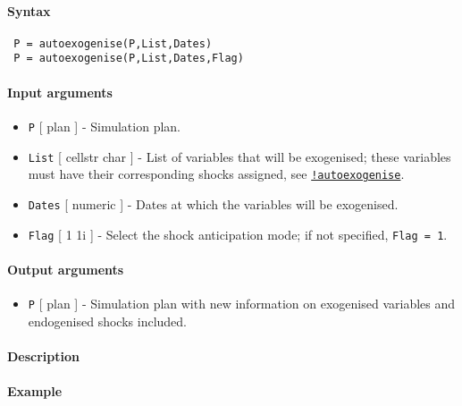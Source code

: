


	\paragraph{Syntax}
 
 \begin{verbatim}
 P = autoexogenise(P,List,Dates)
 P = autoexogenise(P,List,Dates,Flag)
 \end{verbatim}
 
 \paragraph{Input arguments}
 
 \begin{itemize}
 \item
   \texttt{P} {[} plan {]} - Simulation plan.
 \item
   \texttt{List} {[} cellstr \textbar{} char {]} - List of variables that
   will be exogenised; these variables must have their corresponding
   shocks assigned, see
   \href{modellang/autoexogenise}{\texttt{!autoexogenise}}.
 \item
   \texttt{Dates} {[} numeric {]} - Dates at which the variables will be
   exogenised.
 \item
   \texttt{Flag} {[} 1 \textbar{} 1i {]} - Select the shock anticipation
   mode; if not specified, \texttt{Flag = 1}.
 \end{itemize}
 
 \paragraph{Output arguments}
 
 \begin{itemize}
 \item
   \texttt{P} {[} plan {]} - Simulation plan with new information on
   exogenised variables and endogenised shocks included.
 \end{itemize}
 
 \paragraph{Description}
 
 \paragraph{Example}


